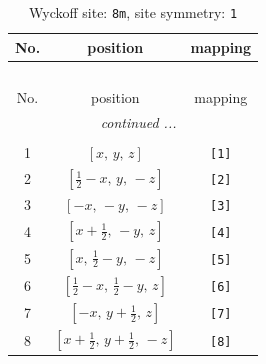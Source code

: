 \documentclass[fleqn,8pt]{jsarticle}
\begin{document}
\renewcommand{\arraystretch}{1.2}
\begin{longtable}{ccc}
\caption{Wyckoff site: {\tt 8m}, site symmetry: {\tt 1}}
 \\
 \hline \hline
No. & position & mapping \\ \hline \endfirsthead

\multicolumn{2}{l}{\tablename\ \thetable{}} \\
 \hline \hline
No. & position & mapping \\ \hline \endhead

 \hline \hline
\multicolumn{2}{r}{\footnotesize\it continued ...} \\ \endfoot

 \hline \hline
\multicolumn{2}{r}{} \\ \endlastfoot

1 & $\left[ x,\, y,\, z \right]$ & {\tt [1]} \\ \hline
2 & $\left[ \frac{1}{2} - x,\, y,\, - z \right]$ & {\tt [2]} \\ \hline
3 & $\left[ - x,\, - y,\, - z \right]$ & {\tt [3]} \\ \hline
4 & $\left[ x + \frac{1}{2},\, - y,\, z \right]$ & {\tt [4]} \\ \hline
5 & $\left[ x,\, \frac{1}{2} - y,\, - z \right]$ & {\tt [5]} \\ \hline
6 & $\left[ \frac{1}{2} - x,\, \frac{1}{2} - y,\, z \right]$ & {\tt [6]} \\ \hline
7 & $\left[ - x,\, y + \frac{1}{2},\, z \right]$ & {\tt [7]} \\ \hline
8 & $\left[ x + \frac{1}{2},\, y + \frac{1}{2},\, - z \right]$ & {\tt [8]} \\
\end{longtable}
\end{document}
